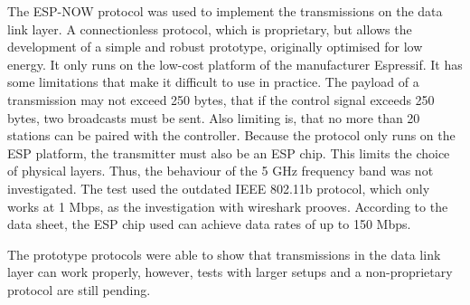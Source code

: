 The ESP-NOW protocol was used to implement the transmissions on the data link layer.
A connectionless protocol, which is proprietary, but allows the development of a simple and robust prototype,
originally optimised for low energy.
It only runs on the low-cost platform of the manufacturer Espressif.
It has some limitations that make it difficult to use in practice.
The payload of a transmission may not exceed 250 bytes, 
that if the control signal exceeds 250 bytes, two broadcasts must be sent.
Also limiting is, that no more than 20 stations can be paired with the controller.
Because the protocol only runs on the ESP platform, the transmitter must also be an ESP chip.
This limits the choice of physical layers.
Thus, the behaviour of the 5 GHz frequency band was not investigated.
The test used the outdated IEEE 802.11b protocol, which only works at 1 Mbps,
as the investigation with wireshark prooves.
According to the data sheet, the ESP chip used can achieve data rates of up to 150 Mbps.

The prototype protocols were able to show that transmissions in the data link layer can work properly,
however, tests with larger setups and a non-proprietary protocol are still pending.
